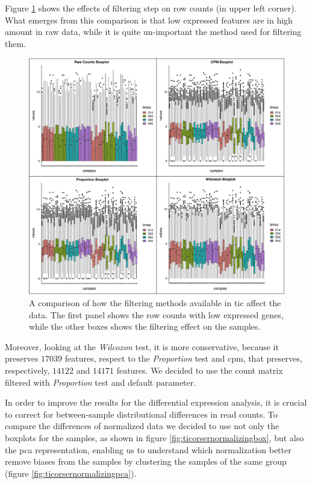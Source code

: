 Figure \ref{fig:ticorserfiltering} shows the effects of filtering step on row counts (in upper left corner). 
What emerges from this comparison is that low expressed features are in high amount in raw data, while it is quite un-important the method used for filtering them.

\begin{figure}[H]
\centering
\includegraphics[width=12cm, keepaspectratio]{img/ticorser/filtering/panel1.pdf}
\caption[ticorser filtering methods]{A comparison of how the filtering methods available in \gls{tic} affect the data.
The first panel shows the row counts with low expressed genes, while the other boxes shows the filtering effect on the samples.}
\label{fig:ticorserfiltering}

\end{figure}

Moreover, looking at the \textit{Wilcoxon} test, it is more conservative, because it preserves $17039$ features, respect to the \textit{Proportion} test and \gls{cpm}, that preserves, respectively, $14122$ and $14171$ features.
We decided to use the count matrix filtered with \textit{Proportion} test and default parameter.  

In order to improve the results for the differential expression analysis, it is crucial to correct for between-sample distributional differences in read counts.
To compare the differences of normalized data we decided to use not only the boxplots for the samples, as shown in  figure \ref{fig:ticorsernormalizingbox}, but also the \gls{pca} representation, enabling us to understand which normalization better remove biases from the samples by clustering the samples of the same group (figure \ref{fig:ticorsernormalizingpca}).

